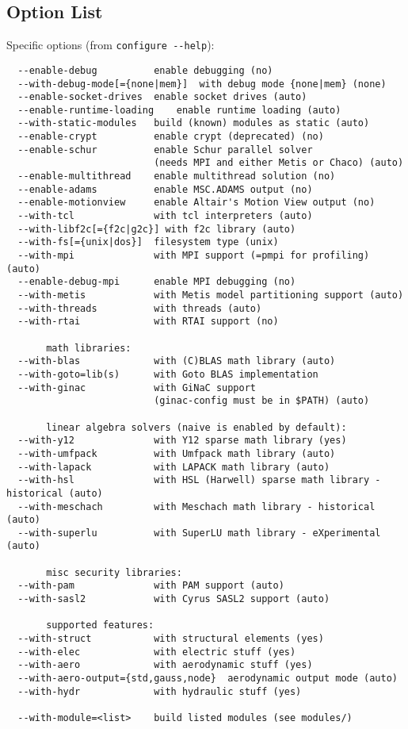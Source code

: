 \documentclass[10pt,dvips]{report}
\newcommand{\kw}[1]{\texttt{#1}}
\begin{document}
\subsection{Option List}
Specific options (from \kw{configure -{}-help}):
{\small
\begin{verbatim}
  --enable-debug          enable debugging (no)
  --with-debug-mode[={none|mem}]  with debug mode {none|mem} (none)
  --enable-socket-drives  enable socket drives (auto)
  --enable-runtime-loading    enable runtime loading (auto)
  --with-static-modules   build (known) modules as static (auto)
  --enable-crypt          enable crypt (deprecated) (no)
  --enable-schur          enable Schur parallel solver
                          (needs MPI and either Metis or Chaco) (auto)
  --enable-multithread    enable multithread solution (no)
  --enable-adams          enable MSC.ADAMS output (no)
  --enable-motionview     enable Altair's Motion View output (no)
  --with-tcl              with tcl interpreters (auto)
  --with-libf2c[={f2c|g2c}] with f2c library (auto)
  --with-fs[={unix|dos}]  filesystem type (unix)
  --with-mpi              with MPI support (=pmpi for profiling) (auto)
  --enable-debug-mpi      enable MPI debugging (no)
  --with-metis            with Metis model partitioning support (auto)
  --with-threads          with threads (auto)
  --with-rtai             with RTAI support (no)

       math libraries:
  --with-blas             with (C)BLAS math library (auto)
  --with-goto=lib(s)      with Goto BLAS implementation
  --with-ginac            with GiNaC support
                          (ginac-config must be in $PATH) (auto)

       linear algebra solvers (naive is enabled by default):
  --with-y12              with Y12 sparse math library (yes)
  --with-umfpack          with Umfpack math library (auto)
  --with-lapack           with LAPACK math library (auto)
  --with-hsl              with HSL (Harwell) sparse math library - historical (auto)
  --with-meschach         with Meschach math library - historical (auto)
  --with-superlu          with SuperLU math library - eXperimental (auto)

       misc security libraries:
  --with-pam              with PAM support (auto)
  --with-sasl2            with Cyrus SASL2 support (auto)

       supported features:
  --with-struct           with structural elements (yes)
  --with-elec             with electric stuff (yes)
  --with-aero             with aerodynamic stuff (yes)
  --with-aero-output={std,gauss,node}  aerodynamic output mode (auto)
  --with-hydr             with hydraulic stuff (yes)

  --with-module=<list>    build listed modules (see modules/)
\end{verbatim}
}
\end{document}
